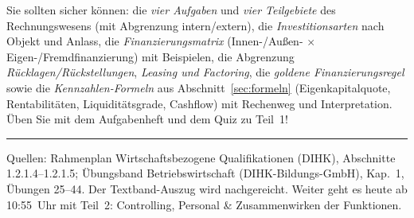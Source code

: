 \documentclass[11pt, a4paper]{article}
\begin{document}
\begin{merksatz}[title={\bfseries Wichtig für die Prüfungsvorbereitung (Teil 1)}]
Sie sollten sicher können: die \emph{vier Aufgaben} und \emph{vier Teilgebiete} des
Rechnungswesens (mit Abgrenzung intern/extern), die \emph{Investitionsarten} nach Objekt
und Anlass, die \emph{Finanzierungsmatrix} (Innen-/Außen- $\times$ Eigen-/Fremdfinanzierung)
mit Beispielen, die Abgrenzung \emph{Rücklagen/Rückstellungen}, \emph{Leasing und
Factoring}, die \emph{goldene Finanzierungsregel} sowie die \emph{Kennzahlen-Formeln} aus
Abschnitt~\ref{sec:formeln} (Eigenkapitalquote, Rentabilitäten, Liquiditätsgrade,
Cashflow) mit Rechenweg und Interpretation. Üben Sie mit dem Aufgabenheft und dem Quiz
zu Teil~1!
\end{merksatz}

\vspace{1em}
\hrule
\vspace{0.8em}
\noindent\textsf{\small Quellen: Rahmenplan Wirtschaftsbezogene Qualifikationen (DIHK),
Abschnitte 1.2.1.4--1.2.1.5; Übungsband Betriebswirtschaft (DIHK-Bildungs-GmbH),
Kap.~1, Übungen 25--44. Der Textband-Auszug wird nachgereicht. Weiter geht es heute ab
10:55~Uhr mit Teil~2: Controlling, Personal \& Zusammenwirken der Funktionen.}
\end{document}
